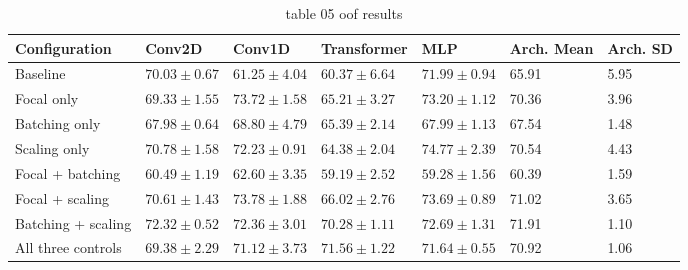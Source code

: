 \begin{table}[t]
\centering
\caption{table 05 oof results}
\label{tab:oof_results}
\begin{tabular}{lllllll}
\hline
Configuration & Conv2D & Conv1D & Transformer & MLP & Arch. Mean & Arch. SD \\
\hline
Baseline & $70.03\pm0.67$ & $61.25\pm4.04$ & $60.37\pm6.64$ & $71.99\pm0.94$ & 65.91 & 5.95 \\
Focal only & $69.33\pm1.55$ & $73.72\pm1.58$ & $65.21\pm3.27$ & $73.20\pm1.12$ & 70.36 & 3.96 \\
Batching only & $67.98\pm0.64$ & $68.80\pm4.79$ & $65.39\pm2.14$ & $67.99\pm1.13$ & 67.54 & 1.48 \\
Scaling only & $70.78\pm1.58$ & $72.23\pm0.91$ & $64.38\pm2.04$ & $74.77\pm2.39$ & 70.54 & 4.43 \\
Focal + batching & $60.49\pm1.19$ & $62.60\pm3.35$ & $59.19\pm2.52$ & $59.28\pm1.56$ & 60.39 & 1.59 \\
Focal + scaling & $70.61\pm1.43$ & $73.78\pm1.88$ & $66.02\pm2.76$ & $73.69\pm0.89$ & 71.02 & 3.65 \\
Batching + scaling & $72.32\pm0.52$ & $72.36\pm3.01$ & $70.28\pm1.11$ & $72.69\pm1.31$ & 71.91 & 1.10 \\
All three controls & $69.38\pm2.29$ & $71.12\pm3.73$ & $71.56\pm1.22$ & $71.64\pm0.55$ & 70.92 & 1.06 \\
\hline
\end{tabular}
\end{table}
